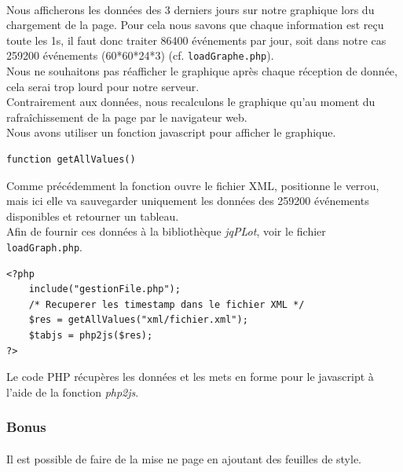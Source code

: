 \documentclass[a4paper, titlepage, oneside, 12pt]{article}%
\begin{document}
\paragraph{}
 Nous afficherons les données des 3 derniers jours sur notre graphique lors du chargement de la page. Pour cela nous savons que chaque information est reçu toute les 1s, il faut donc traiter 86400 événements par jour, soit dans notre cas 259200 événements (60*60*24*3) (cf. \texttt{loadGraphe.php}).\\
Nous ne souhaitons pas réafficher le graphique après chaque réception de donnée, cela serai trop lourd pour notre serveur.\\ Contrairement aux données, nous recalculons le graphique qu'au moment du rafraîchissement de la page par le navigateur web. \\
Nous avons utiliser un fonction javascript pour afficher le graphique.
\begin{lstlisting}
function getAllValues()
\end{lstlisting}
Comme précédemment la fonction ouvre le fichier XML, positionne le verrou, mais ici elle va sauvegarder uniquement les données des 259200 événements disponibles et retourner un tableau.\\
Afin de fournir ces données à la bibliothèque \textit{jqPLot}, voir le fichier \texttt{loadGraph.php}.
\begin{lstlisting}
<?php 
	include("gestionFile.php"); 
	/* Recuperer les timestamp dans le fichier XML */
	$res = getAllValues("xml/fichier.xml");
	$tabjs = php2js($res);
?>
\end{lstlisting}
Le code PHP récupères les données et les mets en forme pour le javascript à l'aide de la fonction \textit{php2js}.\\
\subsubsection{Bonus}
\paragraph{}
Il est possible de faire de la mise ne page en ajoutant des feuilles de style.
\end{document}
